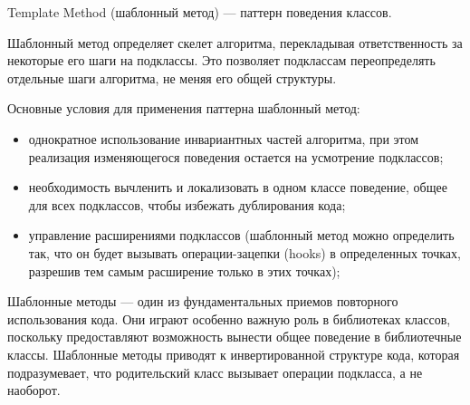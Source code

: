 Template Method (шаблонный метод) \cite{patterns} --- паттерн поведения классов.

Шаблонный метод определяет скелет алгоритма, перекладывая ответственность за некоторые его шаги на подклассы. Это позволяет подклассам переопределять отдельные шаги алгоритма, не меняя его общей структуры.

Основные условия для применения паттерна шаблонный метод:

\begin{itemize}[label*=---]
	\item однократное использование инвариантных частей алгоритма, при этом реализация изменяющегося поведения остается на усмотрение подклассов;
	\item необходимость вычленить и локализовать в одном классе поведение, общее для всех подклассов, чтобы избежать дублирования кода;
	\item управление расширениями подклассов (шаблонный метод можно определить так, что он будет вызывать операции-зацепки (hooks) в определенных точках, разрешив тем самым расширение только в этих точках);
\end{itemize}

Шаблонные методы --- один из фундаментальных приемов повторного использования кода. Они играют особенно важную роль в библиотеках классов, поскольку предоставляют возможность вынести общее поведение в библиотечные классы. Шаблонные методы приводят к инвертированной структуре кода, которая подразумевает, что родительский класс вызывает операции подкласса, а не наоборот.

\pagebreak